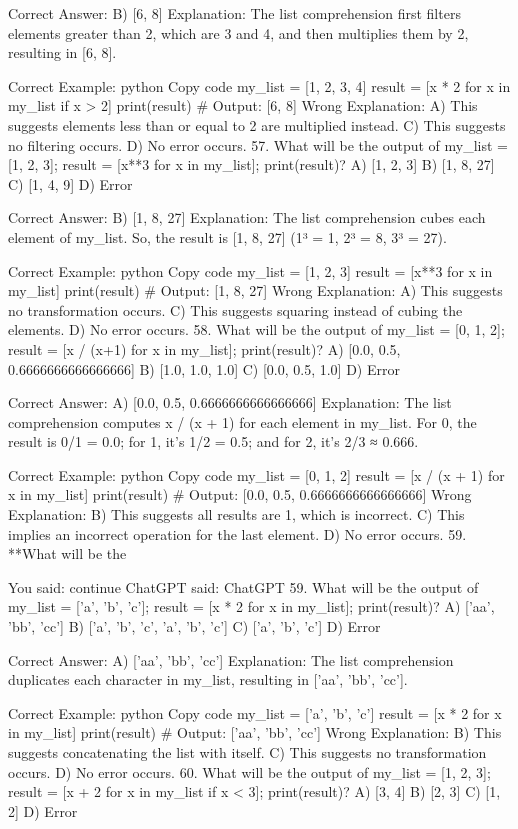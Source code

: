 Correct Answer: B) [6, 8]
Explanation: The list comprehension first filters elements greater than 2, which are 3 and 4, and then multiplies them by 2, resulting in [6, 8].

Correct Example:
python
Copy code
my_list = [1, 2, 3, 4]
result = [x * 2 for x in my_list if x > 2]
print(result)  # Output: [6, 8]
Wrong Explanation:
A) This suggests elements less than or equal to 2 are multiplied instead.
C) This suggests no filtering occurs.
D) No error occurs.
57. What will be the output of my_list = [1, 2, 3]; result = [x**3 for x in my_list]; print(result)?
A) [1, 2, 3]
B) [1, 8, 27]
C) [1, 4, 9]
D) Error

Correct Answer: B) [1, 8, 27]
Explanation: The list comprehension cubes each element of my_list. So, the result is [1, 8, 27] (1³ = 1, 2³ = 8, 3³ = 27).

Correct Example:
python
Copy code
my_list = [1, 2, 3]
result = [x**3 for x in my_list]
print(result)  # Output: [1, 8, 27]
Wrong Explanation:
A) This suggests no transformation occurs.
C) This suggests squaring instead of cubing the elements.
D) No error occurs.
58. What will be the output of my_list = [0, 1, 2]; result = [x / (x+1) for x in my_list]; print(result)?
A) [0.0, 0.5, 0.6666666666666666]
B) [1.0, 1.0, 1.0]
C) [0.0, 0.5, 1.0]
D) Error

Correct Answer: A) [0.0, 0.5, 0.6666666666666666]
Explanation: The list comprehension computes x / (x + 1) for each element in my_list. For 0, the result is 0/1 = 0.0; for 1, it's 1/2 = 0.5; and for 2, it's 2/3 ≈ 0.666.

Correct Example:
python
Copy code
my_list = [0, 1, 2]
result = [x / (x + 1) for x in my_list]
print(result)  # Output: [0.0, 0.5, 0.6666666666666666]
Wrong Explanation:
B) This suggests all results are 1, which is incorrect.
C) This implies an incorrect operation for the last element.
D) No error occurs.
59. **What will be the





You said:
continue
ChatGPT said:
ChatGPT
59. What will be the output of my_list = ['a', 'b', 'c']; result = [x * 2 for x in my_list]; print(result)?
A) ['aa', 'bb', 'cc']
B) ['a', 'b', 'c', 'a', 'b', 'c']
C) ['a', 'b', 'c']
D) Error

Correct Answer: A) ['aa', 'bb', 'cc']
Explanation: The list comprehension duplicates each character in my_list, resulting in ['aa', 'bb', 'cc'].

Correct Example:
python
Copy code
my_list = ['a', 'b', 'c']
result = [x * 2 for x in my_list]
print(result)  # Output: ['aa', 'bb', 'cc']
Wrong Explanation:
B) This suggests concatenating the list with itself.
C) This suggests no transformation occurs.
D) No error occurs.
60. What will be the output of my_list = [1, 2, 3]; result = [x + 2 for x in my_list if x < 3]; print(result)?
A) [3, 4]
B) [2, 3]
C) [1, 2]
D) Error

